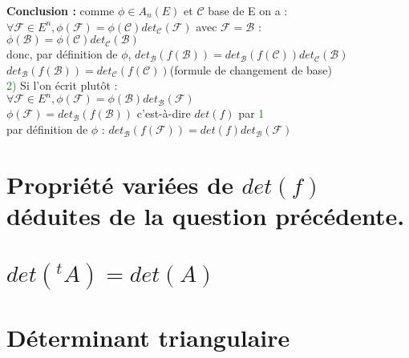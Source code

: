 \documentclass{article}
\begin{document}
{\bf Conclusion :} comme $\phi \in A_n(E)$ et $\mathcal C$ base de E on a : \\
$\forall \mathcal F \in E^n, \phi(\mathcal F)= \phi(\mathcal C)det_{\mathcal C}(\mathcal F)$
avec $\mathcal F=\mathcal B$ : \\
$\phi(\mathcal B)=\phi(\mathcal C) det_{\mathcal C}(\mathcal B)$ \\
donc, par définition de $\phi$, $det_{\mathcal B}(f(\mathcal B))= det_{\mathcal B}(f(\mathcal C))det_{\mathcal C}(\mathcal B)$ \\
$det_{\mathcal B}(f(\mathcal B))=det_{\mathcal C}(f(\mathcal C))$(formule de changement de base) \\
\textcolor{green}{2)} Si l'on écrit plutôt : \\
$\forall \mathcal F \in E^n, \phi(\mathcal F)= \phi(\mathcal B)det_{\mathcal B}(\mathcal F)$ \\
$\phi(\mathcal F)=det_{\mathcal B}(f(\mathcal B))$ c'est-à-dire $det(f)$ par \textcolor{green}{1} \\
par définition de $\phi$ : $det_{\mathcal B}(f(\mathcal F))=det(f)det_{\mathcal B}(\mathcal F)$
	\section{Propriété variées de $det(f)$ déduites de la question précédente.}
	
	\section{$det({}^tA)=det(A)$}
	\section{Déterminant triangulaire}
	
\end{document}
